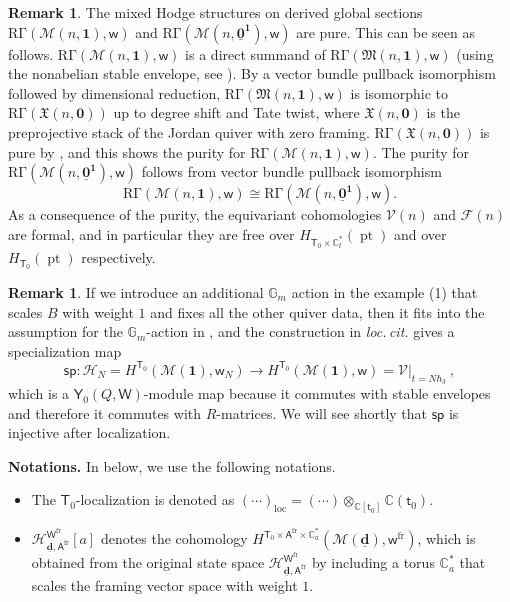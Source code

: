 \documentclass[10pt]{amsart}
\theoremstyle{definition}
\newtheorem{Remark}[Theorem]{Remark}
\numberwithin{equation}{section}
\newcommand{\bC}{\mathbb{C}}
\newcommand{\bG}{\mathbb{G}}
\newcommand{\bd}{\mathbf{d}}
\newcommand{\cF}{\mathcal{F}}
\newcommand{\cH}{\mathcal{H}}
\newcommand{\cM}{\mathcal{M}}
\newcommand{\cV}{\mathcal{V}}
\newcommand{\fM}{\mathfrak{M}}
\newcommand{\fX}{\mathfrak{X}}
\newcommand{\loc}{\mathrm{loc}}
\newcommand{\sA}{\mathsf{A}}
\newcommand{\sT}{\mathsf{T}}
\newcommand{\sW}{\mathsf{W}}
\newcommand{\sw}{\mathsf{w}}
\newcommand{\pt}{\operatorname{pt}}
\begin{document}
\begin{Remark}\label{rmk purity for V and F}
The mixed Hodge structures on derived global sections $\mathrm{R\Gamma}(\cM(n,\mathbf 1),\sw)$ and $\mathrm{R\Gamma}(\cM(n,\underline{\mathbf 0}^{\mathbf 1}),\sw)$ are pure. This can be seen as follows. $\mathrm{R\Gamma}(\cM(n,\mathbf 1),\sw)$ is a direct summand of $\mathrm{R\Gamma}(\fM(n,\mathbf 1),\sw)$ (using the nonabelian stable envelope, see \cite[\S 9.1]{COZZ}). By a vector bundle pullback isomorphism followed by dimensional reduction, $\mathrm{R\Gamma}(\fM(n,\mathbf 1),\sw)$ is isomorphic to $\mathrm{R\Gamma}(\fX(n,\mathbf 0))$ up to degree shift and Tate twist, where $\fX(n,\mathbf 0)$ is the preprojective stack of the Jordan quiver with zero framing. $\mathrm{R\Gamma}(\fX(n,\mathbf 0))$ is pure by \cite[Thm.~A]{Dav2}, and this shows the purity for $\mathrm{R\Gamma}(\cM(n,\mathbf 1),\sw)$. The purity for $\mathrm{R\Gamma}(\cM(n,\underline{\mathbf 0}^{\mathbf 1}),\sw)$ follows from vector bundle pullback isomorphism 
$$\mathrm{R\Gamma}(\cM(n,\mathbf 1),\sw)\cong\mathrm{R\Gamma}(\cM(n,\underline{\mathbf 0}^{\mathbf 1}),\sw). $$
As a consequence of the purity, the equivariant cohomologies $\cV(n)$ and $\cF(n)$ are formal, and in particular they are free over $H_{\sT_0\times\bC^*_t}(\pt)$ and over $H_{\sT_0}(\pt)$ respectively.
\end{Remark}

\begin{Remark}
If we introduce an additional $\bG_m$ action in the example (1) that scales $B$ with weight $1$ and fixes all the other quiver data, then it fits into the assumption for the $\bG_m$-action in \cite[\S 7.2]{COZZ}, and the construction in \textit{loc.\,cit.} gives a specialization map 
\begin{equation}\label{equ on sp HN}
    \mathsf{sp}\colon \cH_{N}=H^{\sT_0}(\cM(\mathbf 1),\sw_N)\longrightarrow H^{\sT_0}(\cM(\mathbf 1),\sw)=\cV|_{t=N\hbar_3}\:,
\end{equation}
which is a $\mathsf Y_{0}(Q,\sW)$-module map because it commutes with stable envelopes and therefore it commutes with $R$-matrices. We will see shortly that $\mathsf{sp}$ is injective after localization.
\end{Remark}
\textbf{Notations.}  In below, we use the following notations. 
\begin{itemize} 
\item The $\sT_0$-localization is denoted as $(\cdots)_\loc=(\cdots)\otimes_{\bC[\mathsf t_0]}\bC(\mathsf t_0)$. 
\item $\cH^{\sW^{\mathrm{fr}}}_{\underline{\bd},\sA^{\mathrm{fr}}}[a]$ denotes the cohomology $H^{\sT_0\times \sA^{\mathrm{fr}}\times \bC^*_a}(\cM(\underline{\bd}),\sw^{\mathrm{fr}})$, which is obtained from the original state space $\cH^{\sW^{\mathrm{fr}}}_{\underline{\bd},\sA^{\mathrm{fr}}}$ by including a torus $\bC^*_a$ that scales the framing vector space with weight $1$.
\end{itemize}
\end{document}
